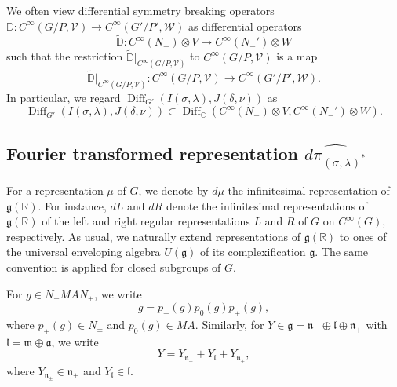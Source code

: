 \documentclass[a4paper,11pt,reqno]{amsart}
\newcommand{\fraka}{\mathfrak{a}}
\newcommand{\frakg}{\mathfrak{g}}
\newcommand{\frakm}{\mathfrak{m}}
\newcommand{\frakn}{\mathfrak{n}}
\newcommand{\DD}{\mathbb{D}}
\newcommand{\0}{{\bf 0}}
\newcommand{\R}{\mathbb{R}}
\newcommand{\C}{\mathbb{C}}
\newcommand{\1}{{\bf 1}}
\newcommand{\frakl}{{\mathfrak l}}
\DeclareMathOperator{\Diff}{Diff}
\theoremstyle{plain}
\theoremstyle{definition}
\numberwithin{equation}{section}
\theoremstyle{definition}
\begin{document}
We often view differential symmetry breaking operators
$\DD \colon
C^\infty(G/P,\mathcal{V})
\to C^\infty(G'/P',\mathcal{W})$
as differential operators 
\begin{equation*}
\widetilde{\DD} \colon C^\infty(N_-) \otimes V
\to C^\infty(N_-') \otimes W
\end{equation*}
such that
the restriction $\widetilde{\DD}\vert_{C^\infty(G/P,\mathcal{V})}$
to $C^\infty(G/P,\mathcal{V})$ is a map
\begin{equation*}
\widetilde{\DD}\vert_{C^\infty(G/P,\mathcal{V})}\colon
C^\infty(G/P,\mathcal{V})
\to C^\infty(G'/P',\mathcal{W}).
\end{equation*}
In particular, we regard $\Diff_{G'}(I(\sigma,\lambda),J(\delta,\nu))$ as
\begin{equation}\label{eqn:space_DifferenitalOperators}
\Diff_{G'}(I(\sigma,\lambda),J(\delta,\nu))
\subset \Diff_\C(C^\infty(N_-)\otimes V, C^\infty(N_-')\otimes W).
\end{equation}


\subsection{Fourier transformed representation \texorpdfstring{$\widehat{d\pi_{(\sigma,\lambda)^*}}$}{ }}
\label{sec:dpi2}

For a representation $\mu$ of $G$, we denote by $d\mu$ 
the infinitesimal representation of $\frakg(\R)$. 
For instance,  $dL$ and $dR$ denote the infinitesimal representations of $\frakg(\R)$ of
the left and right regular representations $L$ and $R$ of $G$ on $C^\infty(G)$, respectively.
As usual, we naturally extend representations of $\frakg(\R)$ 
to ones of the universal enveloping algebra $U(\frakg)$ of its complexification $\frakg$.
The same convention is applied for closed subgroups of $G$.

For $g \in N_-MAN_+$, we write
\begin{equation*}
g = p_-(g)p_0(g)p_+(g),
\end{equation*}
where $p_\pm(g) \in N_{\pm}$ and $p_0(g) \in MA$. 
Similarly, for $Y \in \frakg = \frakn_- \oplus \frakl\oplus \frakn_+$ with $\frakl= \frakm \oplus \fraka$,
we write
\begin{equation*}
Y=Y_{\frakn_-} + Y_{\frakl} + Y_{\frakn_+},
\end{equation*}
where $Y_{\frakn_{\pm}} \in \frakn_{\pm}$ and $Y_\frakl \in \frakl$.
\end{document}
